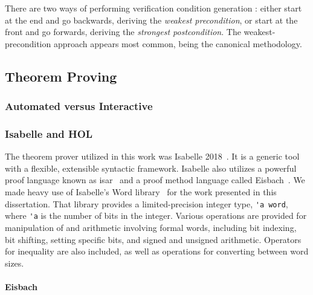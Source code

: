 There are two ways of performing verification condition generation%
:
either start at the end and go backwards, deriving the \emph{weakest precondition},%
or start at the front and go forwards, deriving the \emph{strongest postcondition}.%
The weakest-precondition approach appears most common,
being the canonical methodology.


\subsection{Theorem Proving}
%

\subsubsection{Automated versus Interactive}

\subsubsection{Isabelle and HOL}
The theorem prover utilized in this work
was Isabelle 2018~\citep{nipkow2002isabelle}.%
It is a generic tool with a flexible, extensible syntactic framework.
Isabelle also utilizes a powerful proof language
known as \ac{isar}~\citep{wenzel2007isabelle}
and a proof method language called Eisbach~\citep{matichuk2016eisbach}.
We made heavy use of Isabelle's Word library~\citep{isabelle-word-session}
for the work presented in this dissertation.
That library provides a limited-precision integer type, \lstinline|'a word|,
where \lstinline|'a| is the number of bits in the integer.
Various operations are provided for manipulation of and arithmetic involving formal words,
including bit indexing, bit shifting, setting specific bits,
and signed and unsigned arithmetic.
Operators for inequality are also included,
as well as operations for converting between word sizes.

\paragraph{Eisbach}


